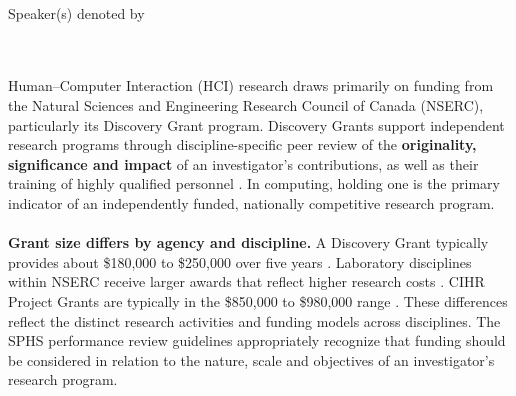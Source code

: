 \documentclass[11pt]{article}
\begin{document}
\sectionbreak
{}\\
Speaker(s) denoted by \dag

\begin{cvparts}

    \nocite{*}



    \keepwithnext

    \keepwithnext

\end{cvparts}


\ifAPR %
\sectionbreak
{}
\\ \\
Human–Computer Interaction (HCI) research draws primarily on funding from the Natural Sciences and Engineering Research Council of Canada (NSERC), particularly its Discovery Grant program. Discovery Grants support independent research programs through discipline-specific peer review of the \textbf{originality, significance and impact} of an investigator's contributions, as well as their training of highly qualified personnel . In computing, holding one is the primary indicator of an independently funded, nationally competitive research program.
\\ \\
\textbf{Grant size differs by agency and discipline.} A Discovery Grant typically provides about \$180{,}000 to \$250{,}000 over five years . Laboratory disciplines within NSERC receive larger awards that reflect higher research costs . CIHR Project Grants are typically in the \$850{,}000 to \$980{,}000 range . These differences reflect the distinct research activities and funding models across disciplines. The SPHS performance review guidelines appropriately recognize that funding should be considered in relation to the nature, scale and objectives of an investigator's research program.
\end{document}
